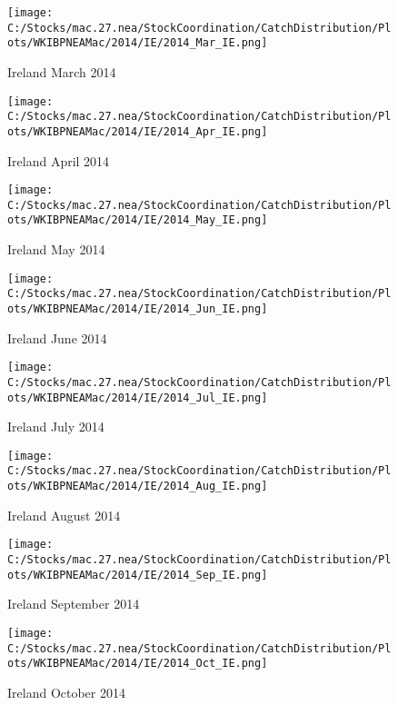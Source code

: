 \documentclass{article}
\begin{document}
\begin{figure}
	\centering
		\texttt{[image: C:/Stocks/mac.27.nea/StockCoordination/CatchDistribution/Plots/WKIBPNEAMac/2014/IE/2014\_Mar\_IE.png]}
	\caption{Ireland March 2014}
	\label{fig:2014_Mar_IE}
\end{figure}

\begin{figure}
	\centering
		\texttt{[image: C:/Stocks/mac.27.nea/StockCoordination/CatchDistribution/Plots/WKIBPNEAMac/2014/IE/2014\_Apr\_IE.png]}
	\caption{Ireland April 2014}
	\label{fig:2014_Apr_IE}
\end{figure}

\begin{figure}
	\centering
		\texttt{[image: C:/Stocks/mac.27.nea/StockCoordination/CatchDistribution/Plots/WKIBPNEAMac/2014/IE/2014\_May\_IE.png]}
	\caption{Ireland May 2014}
	\label{fig:2014_May_IE}
\end{figure}

\begin{figure}
	\centering
		\texttt{[image: C:/Stocks/mac.27.nea/StockCoordination/CatchDistribution/Plots/WKIBPNEAMac/2014/IE/2014\_Jun\_IE.png]}
	\caption{Ireland June 2014}
	\label{fig:2014_Jun_IE}
\end{figure}

\begin{figure}
	\centering
		\texttt{[image: C:/Stocks/mac.27.nea/StockCoordination/CatchDistribution/Plots/WKIBPNEAMac/2014/IE/2014\_Jul\_IE.png]}
	\caption{Ireland July 2014}
	\label{fig:2014_Jul_IE}
\end{figure}

\begin{figure}
	\centering
		\texttt{[image: C:/Stocks/mac.27.nea/StockCoordination/CatchDistribution/Plots/WKIBPNEAMac/2014/IE/2014\_Aug\_IE.png]}
	\caption{Ireland August 2014}
	\label{fig:2014_Aug_IE}
\end{figure}

\begin{figure}
	\centering
		\texttt{[image: C:/Stocks/mac.27.nea/StockCoordination/CatchDistribution/Plots/WKIBPNEAMac/2014/IE/2014\_Sep\_IE.png]}
	\caption{Ireland September 2014}
	\label{fig:2014_Sep_IE}
\end{figure}

\begin{figure}
	\centering
		\texttt{[image: C:/Stocks/mac.27.nea/StockCoordination/CatchDistribution/Plots/WKIBPNEAMac/2014/IE/2014\_Oct\_IE.png]}
	\caption{Ireland October 2014}
	\label{fig:2014_Oct_IE}
\end{figure}
\end{document}
